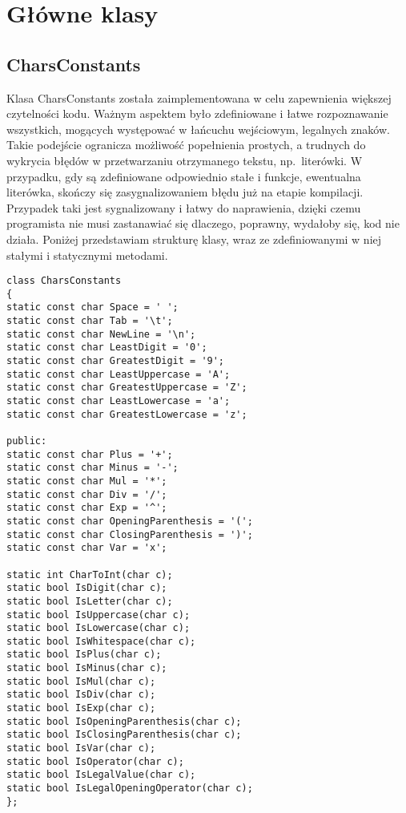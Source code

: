 \section{Główne klasy}

\subsection{CharsConstants}

Klasa CharsConstants została zaimplementowana w celu zapewnienia większej czytelności kodu. Ważnym aspektem było zdefiniowane i łatwe rozpoznawanie wszystkich, mogących występować w łańcuchu wejściowym, legalnych znaków. Takie podejście ogranicza możliwość popełnienia prostych, a trudnych do wykrycia błędów w przetwarzaniu otrzymanego tekstu, np.\ literówki. W przypadku, gdy są zdefiniowane odpowiednio stałe i funkcje, ewentualna literówka, skończy się zasygnalizowaniem błędu już na etapie kompilacji. Przypadek taki jest sygnalizowany i łatwy do naprawienia, dzięki czemu programista nie musi zastanawiać się dlaczego, poprawny, wydałoby się, kod nie działa. Poniżej przedstawiam strukturę klasy, wraz ze zdefiniowanymi w niej stałymi i statycznymi metodami. 

\begin{lstlisting}
class CharsConstants
{
static const char Space = ' ';
static const char Tab = '\t';
static const char NewLine = '\n';
static const char LeastDigit = '0';
static const char GreatestDigit = '9';
static const char LeastUppercase = 'A';
static const char GreatestUppercase = 'Z';
static const char LeastLowercase = 'a';
static const char GreatestLowercase = 'z';

public:
static const char Plus = '+';
static const char Minus = '-';
static const char Mul = '*';
static const char Div = '/';
static const char Exp = '^';
static const char OpeningParenthesis = '(';
static const char ClosingParenthesis = ')';
static const char Var = 'x';

static int CharToInt(char c);
static bool IsDigit(char c);
static bool IsLetter(char c);
static bool IsUppercase(char c);
static bool IsLowercase(char c);
static bool IsWhitespace(char c);
static bool IsPlus(char c);
static bool IsMinus(char c);
static bool IsMul(char c);
static bool IsDiv(char c);
static bool IsExp(char c);
static bool IsOpeningParenthesis(char c);
static bool IsClosingParenthesis(char c);
static bool IsVar(char c);
static bool IsOperator(char c);
static bool IsLegalValue(char c);
static bool IsLegalOpeningOperator(char c);
};
\end{lstlisting}


